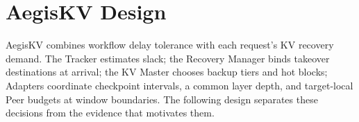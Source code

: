 \section{AegisKV Design}
\label{sec:design}

AegisKV combines workflow delay tolerance with each request's KV
recovery demand. The Tracker estimates slack; the Recovery Manager binds
takeover destinations at arrival; the KV Master chooses backup tiers
and hot blocks; Adapters coordinate checkpoint intervals, a common layer
depth, and target-local Peer budgets at window boundaries. The following design
separates these decisions from the evidence that motivates them.








